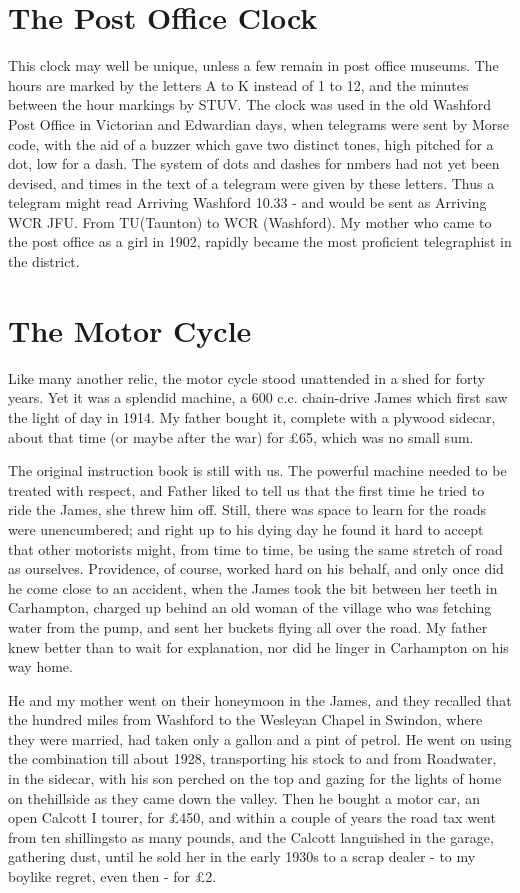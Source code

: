 \section{The Post Office Clock}

This clock may well be unique, unless a few remain in post office museums. The hours are marked by the letters A to K instead of 1 to 12, and the minutes between the hour markings by STUV. The clock was used in the old Washford Post Office in Victorian and Edwardian days, when telegrams were sent by Morse code, with the aid of a buzzer which gave two distinct tones, high pitched for a dot, low for a dash. The system of dots and dashes for nmbers had not yet been devised, and times in the text of a telegram were given by these letters. Thus a telegram might read Arriving Washford 10.33 - and would be sent as Arriving WCR JFU. From TU(Taunton) to WCR (Washford).
My mother who came to the post office as a girl in 1902, rapidly became the most proficient telegraphist in the district.
 
\section{The Motor Cycle}

Like many another relic, the motor cycle stood unattended in a shed for forty years. Yet it was a splendid machine, a 600 c.c. chain-drive James which first saw the light of day in 1914. My father bought it, complete with a plywood sidecar, about that time (or maybe after the war) for £65, which was no small sum.

The original instruction book is still with us. The powerful machine needed to be treated with respect, and Father liked to tell us that the first time he tried to ride the James, she threw him off. Still, there was space to learn for the roads were unencumbered; and right up to his dying day he found it hard to accept that other motorists might, from time to time, be using the same stretch of road as ourselves. Providence, of course, worked hard on his behalf, and only once did he come close to an accident, when the James took the bit between her teeth in Carhampton, charged up behind an old woman of the village who was fetching water from the pump, and sent her buckets flying all over the road. My father knew better than to wait for explanation, nor did he linger in Carhampton on his way home. 

He and my mother went on their honeymoon in the James, and they recalled that the hundred miles from Washford to the Wesleyan Chapel in Swindon, where they were married, had taken only a gallon and a pint of petrol. He went on using the combination till about 1928, transporting his stock to and from Roadwater, in the sidecar, with his son perched on the top and gazing for the lights of home on thehillside as they came down the valley. Then he bought a motor car, an open Calcott I tourer, for £450, and within a couple of years the road tax went from ten shillingsto as many pounds, and the Calcott languished in the garage, gathering dust, until he sold her in the early 1930s to a scrap dealer - to my boylike regret, even then - for £2.
 
